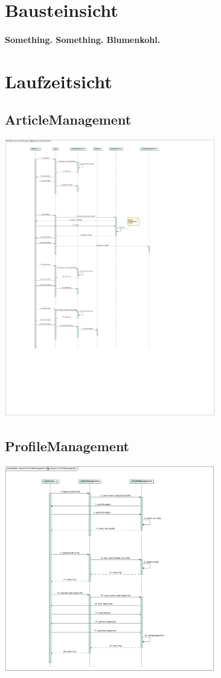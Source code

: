 \documentclass[a4paper]{article}
\begin{document}
\section{Bausteinsicht}

\paragraph{Something. Something. Blumenkohl.}

\section{Laufzeitsicht}

\subsection{ArticleManagement}

\includegraphics[width=350px]{sd-articlemanagement.jpg}

\subsection{ProfileManagement}

\includegraphics[width=350px]{sd-profilemanagement.jpg}
\end{document}
